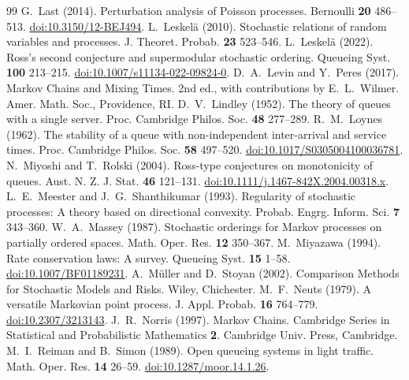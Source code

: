 \documentclass[10pt,a4paper]{amsart}
\numberwithin{equation}{section}
\newcommand{\1}{\mathbf 1}
\begin{document}
\begin{thebibliography}{99}
 G.~Last (2014). Perturbation analysis of Poisson processes. Bernoulli \textbf{20} 486--513. \href{https://doi.org/10.3150/12-BEJ494}{doi:10.3150/12-BEJ494}.
 L.~Leskel\"a (2010). Stochastic relations of random variables and processes. J. Theoret. Probab. \textbf{23} 523--546.
 L.~Leskel\"a (2022). Ross's second conjecture and supermodular stochastic ordering. Queueing Syst. \textbf{100} 213--215. \href{https://doi.org/10.1007/s11134-022-09824-0}{doi:10.1007/s11134-022-09824-0}.
 D.~A.~Levin and Y.~Peres (2017). Markov Chains and Mixing Times. 2nd ed., with contributions by E.~L.~Wilmer. Amer. Math. Soc., Providence, RI.
 D.~V.~Lindley (1952). The theory of queues with a single server. Proc. Cambridge Philos. Soc. \textbf{48} 277--289.
 R.~M.~Loynes (1962). The stability of a queue with non-independent inter-arrival and service times. Proc. Cambridge Philos. Soc. \textbf{58} 497--520. \href{https://doi.org/10.1017/S0305004100036781}{doi:10.1017/S0305004100036781}.
 N.~Miyoshi and T.~Rolski (2004). Ross-type conjectures on monotonicity of queues. Aust. N. Z. J. Stat. \textbf{46} 121--131. \href{https://doi.org/10.1111/j.1467-842X.2004.00318.x}{doi:10.1111/j.1467-842X.2004.00318.x}.
 L.~E.~Meester and J.~G.~Shanthikumar (1993). Regularity of stochastic processes: A theory based on directional convexity. Probab. Engrg. Inform. Sci. \textbf{7} 343--360.
 W.~A.~Massey (1987). Stochastic orderings for Markov processes on partially ordered spaces. Math. Oper. Res. \textbf{12} 350--367.
 M.~Miyazawa (1994). Rate conservation laws: A survey. Queueing Syst. \textbf{15} 1--58. \href{https://doi.org/10.1007/BF01189231}{doi:10.1007/BF01189231}.
 A.~M\"uller and D.~Stoyan (2002). Comparison Methods for Stochastic Models and Risks. Wiley, Chichester.
 M.~F.~Neuts (1979). A versatile Markovian point process. J. Appl. Probab. \textbf{16} 764--779. \href{https://doi.org/10.2307/3213143}{doi:10.2307/3213143}.
 J.~R.~Norris (1997). Markov Chains. Cambridge Series in Statistical and Probabilistic Mathematics \textbf{2}. Cambridge Univ. Press, Cambridge.
 M.~I.~Reiman and B.~Simon (1989). Open queueing systems in light traffic. Math. Oper. Res. \textbf{14} 26--59. \href{https://doi.org/10.1287/moor.14.1.26}{doi:10.1287/moor.14.1.26}.

\end{thebibliography}
\end{document}
